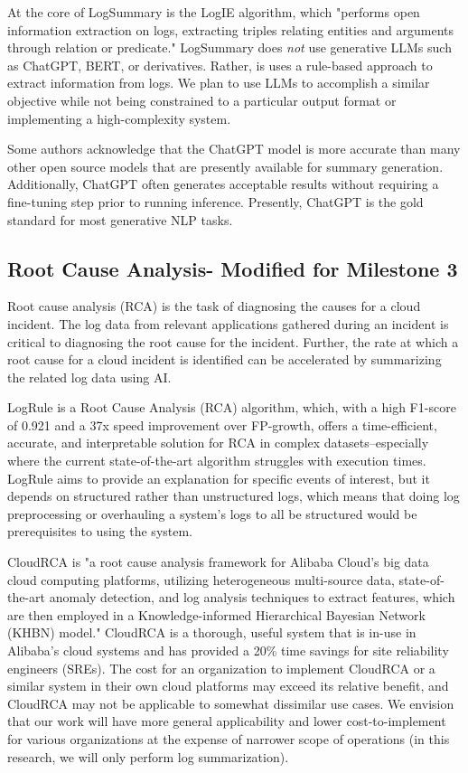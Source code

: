 \documentclass[conference]{IEEEtran}
\begin{document}
At the core of LogSummary is the LogIE algorithm, which "performs open information extraction on logs, extracting triples relating entities and arguments through relation or predicate." \cite{10017337} LogSummary does \textit{not} use generative LLMs such as ChatGPT, BERT, or derivatives. Rather, is uses a rule-based approach to extract information from logs. We plan to use LLMs to accomplish a similar objective while not being constrained to a particular output format or implementing a high-complexity system.

Some authors acknowledge that the ChatGPT model is more accurate than many other open source models that are presently available for summary generation. Additionally, ChatGPT often generates acceptable results without requiring a fine-tuning step prior to running inference. Presently, ChatGPT is the gold standard for most generative NLP tasks.\cite{bendimerad2023onpremise}

\subsection{Root Cause Analysis- Modified for Milestone 3}

Root cause analysis (RCA) is the task of diagnosing the causes for a cloud incident. The log data from relevant applications gathered during an incident is critical to diagnosing the root cause for the incident. Further, the rate at which a root cause for a cloud incident is identified can be accelerated by summarizing the related log data using AI.

LogRule \cite{logrule} is a Root Cause Analysis (RCA) algorithm, which, with a high F1-score of 0.921 and a 37x speed improvement over FP-growth, offers a time-efficient, accurate, and interpretable solution for RCA in complex datasets--especially where the current state-of-the-art algorithm struggles with execution times. LogRule aims to provide an explanation for specific events of interest, but it depends on structured rather than unstructured logs, which means that doing log preprocessing or overhauling a system's logs to all be structured would be prerequisites to using the system.

CloudRCA is "a root cause analysis framework for Alibaba Cloud's big data cloud computing platforms, utilizing heterogeneous multi-source data, state-of-the-art anomaly detection, and log analysis techniques to extract features, which are then employed in a Knowledge-informed Hierarchical Bayesian Network (KHBN) model." \cite{10.1145/3459637.3481903} CloudRCA is a thorough, useful system that is in-use in Alibaba's cloud systems and has provided a 20\% time savings for site reliability engineers (SREs). The cost for an organization to implement CloudRCA or a similar system in their own cloud platforms may exceed its relative benefit, and CloudRCA may not be applicable to somewhat dissimilar use cases. We envision that our work will have more general applicability and lower cost-to-implement for various organizations at the expense of narrower scope of operations (in this research, we will only perform log summarization).
\end{document}
